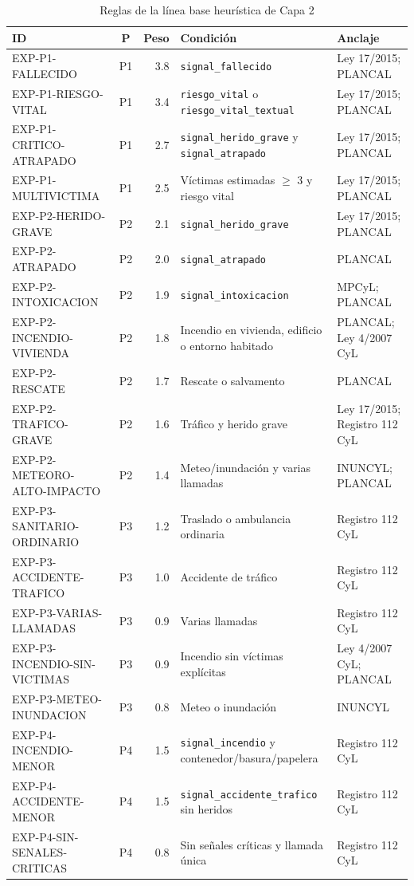 \begin{table}[ht]
\centering
\caption{Reglas de la línea base heurística de Capa 2}
\label{tab:baseline-experto-reglas}
\scriptsize
\begin{tabularx}{\textwidth}{|l|c|r|X|X|}
\hline
\textbf{ID} & \textbf{P} & \textbf{Peso} & \textbf{Condición} & \textbf{Anclaje} \\ \hline
EXP-P1-FALLECIDO & P1 & 3.8 & \texttt{signal\_fallecido} & Ley 17/2015; PLANCAL \\ \hline
EXP-P1-RIESGO-VITAL & P1 & 3.4 & \texttt{riesgo\_vital} o \texttt{riesgo\_vital\_textual} & Ley 17/2015; PLANCAL \\ \hline
EXP-P1-CRITICO-ATRAPADO & P1 & 2.7 & \texttt{signal\_herido\_grave} y \texttt{signal\_atrapado} & Ley 17/2015; PLANCAL \\ \hline
EXP-P1-MULTIVICTIMA & P1 & 2.5 & Víctimas estimadas $\geq$ 3 y riesgo vital & Ley 17/2015; PLANCAL \\ \hline
EXP-P2-HERIDO-GRAVE & P2 & 2.1 & \texttt{signal\_herido\_grave} & Ley 17/2015; PLANCAL \\ \hline
EXP-P2-ATRAPADO & P2 & 2.0 & \texttt{signal\_atrapado} & PLANCAL \\ \hline
EXP-P2-INTOXICACION & P2 & 1.9 & \texttt{signal\_intoxicacion} & MPCyL; PLANCAL \\ \hline
EXP-P2-INCENDIO-VIVIENDA & P2 & 1.8 & Incendio en vivienda, edificio o entorno habitado & PLANCAL; Ley 4/2007 CyL \\ \hline
EXP-P2-RESCATE & P2 & 1.7 & Rescate o salvamento & PLANCAL \\ \hline
EXP-P2-TRAFICO-GRAVE & P2 & 1.6 & Tráfico y herido grave & Ley 17/2015; Registro 112 CyL \\ \hline
EXP-P2-METEORO-ALTO-IMPACTO & P2 & 1.4 & Meteo/inundación y varias llamadas & INUNCYL; PLANCAL \\ \hline
EXP-P3-SANITARIO-ORDINARIO & P3 & 1.2 & Traslado o ambulancia ordinaria & Registro 112 CyL \\ \hline
EXP-P3-ACCIDENTE-TRAFICO & P3 & 1.0 & Accidente de tráfico & Registro 112 CyL \\ \hline
EXP-P3-VARIAS-LLAMADAS & P3 & 0.9 & Varias llamadas & Registro 112 CyL \\ \hline
EXP-P3-INCENDIO-SIN-VICTIMAS & P3 & 0.9 & Incendio sin víctimas explícitas & Ley 4/2007 CyL; PLANCAL \\ \hline
EXP-P3-METEO-INUNDACION & P3 & 0.8 & Meteo o inundación & INUNCYL \\ \hline
EXP-P4-INCENDIO-MENOR & P4 & 1.5 & \texttt{signal\_incendio} y contenedor/basura/papelera & Registro 112 CyL \\ \hline
EXP-P4-ACCIDENTE-MENOR & P4 & 1.5 & \texttt{signal\_accidente\_}\allowbreak\texttt{trafico} sin heridos & Registro 112 CyL \\ \hline
EXP-P4-SIN-SENALES-CRITICAS & P4 & 0.8 & Sin señales críticas y llamada única & Registro 112 CyL \\ \hline
\end{tabularx}
\end{table}

